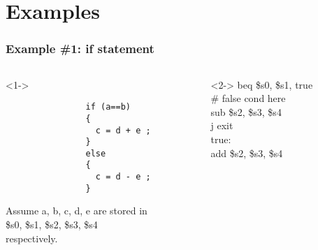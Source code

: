 \documentclass[
	10pt, %
	hmargin=1cm,vmargin=0cm,head=0.5cm,headsep=0pt,foot=0.5cm,margin=2cm
]{beamer}
\begin{document}
\section{Examples}
\begin{frame}[fragile]
	\frametitle{Example \#1: if statement}
	\begin{columns}[c]
		\begin{column}{0.3\textwidth}<1->
			\begin{listing}[H]
			\centering			
			\begin{verbatim}
				if (a==b) 
				{
				  c = d + e ;
				}
				else
				{
				  c = d - e ;
				}
			\end{verbatim}
			\end{listing}
			\begin{flushleft}
				Assume \color{red}a\color{black},\hspace{0.1cm}\color{red} b\color{black},\hspace{0.1cm}\color{red} c\color{black},\hspace{0.1cm}\color{red} d\color{black},\hspace{0.1cm}\color{red} e\color{black} \hspace{0.1cm} are stored in \\ \color{red}\$s0\color{black},\hspace{0.1cm}\color{red} \$s1\color{black},\hspace{0.1cm}\color{red} \$s2\color{black},\hspace{0.1cm}\color{red} \$s3\color{black},\hspace{0.1cm}\color{red} \$s4\color{black}\\ respectively. \pause
			\end{flushleft}
		\end{column}
		\begin{column}{0.3\textwidth}<2->
			\color{blue}beq \color{red}\$s0\color{black}, \color{red}\$s1\color{black}, true \\
			\# false cond here \\
			\color{blue}sub \color{red}\$s2\color{black}, \color{red}\$s3\color{black}, \color{red}\$s4 \\
			\color{blue}j \color{black}exit \\
			true:  \\
			\color{blue}add \color{red}\$s2\color{black}, \color{red}\$s3\color{black}, \color{red}\$s4\color{black} \\

\end{column}
\end{columns}
\end{frame}
\end{document}
